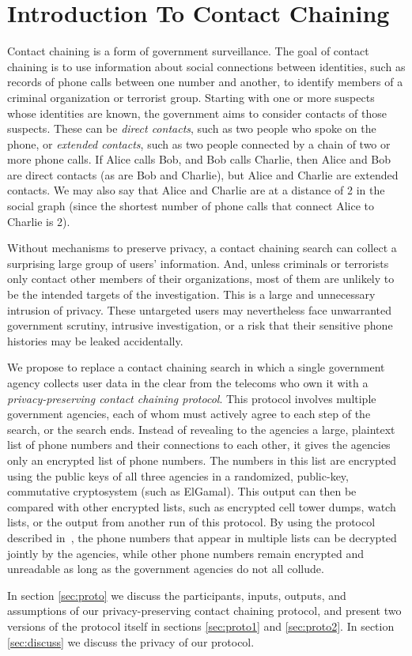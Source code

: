 \section{Introduction To Contact Chaining}

Contact chaining is a form of government surveillance. The goal of contact chaining is to use information about social connections between identities, such as records of phone calls between one number and another, to identify members of a criminal organization or terrorist group. Starting with one or more suspects whose identities are known, the government aims to consider contacts of those suspects. These can be \emph{direct contacts}, such as two people who spoke on the phone, or \emph{extended contacts}, such as two people connected by a chain of two or more phone calls. If Alice calls Bob, and Bob calls Charlie, then Alice and Bob are direct contacts (as are Bob and Charlie), but Alice and Charlie are extended contacts. We may also say that Alice and Charlie are at a distance of 2 in the social graph (since the shortest number of phone calls that connect Alice to Charlie is 2).

Without mechanisms to preserve privacy, a contact chaining search can collect a surprising large group of users' information. And, unless criminals or terrorists only contact other members of their organizations, most of them are unlikely to be the intended targets of the investigation. This is a large and unnecessary intrusion of privacy. These untargeted users may nevertheless face unwarranted government scrutiny, intrusive investigation, or a risk that their sensitive phone histories may be leaked accidentally.

We propose to replace a contact chaining search in which a single government agency collects user data in the clear from the telecoms who own it with a \emph{privacy-preserving contact chaining protocol}. This protocol involves multiple government agencies, each of whom must actively agree to each step of the search, or the search ends. Instead of revealing to the agencies a large, plaintext list of phone numbers and their connections to each other, it gives the agencies only an encrypted list of phone numbers. The numbers in this list are encrypted using the public keys of all three agencies in a randomized, public-key, commutative cryptosystem (such as ElGamal). This output can then be compared with other encrypted lists, such as encrypted cell tower dumps, watch lists, or the output from another run of this protocol. By using the protocol described in~\cite{bandits}, the phone numbers that appear in multiple lists can be decrypted jointly by the agencies, while other phone numbers remain encrypted and unreadable as long as the government agencies do not all collude.

In section \ref{sec:proto} we discuss the participants, inputs, outputs, and assumptions of our privacy-preserving contact chaining protocol, and present two versions of the protocol itself in sections \ref{sec:proto1} and \ref{sec:proto2}. In section \ref{sec:discuss} we discuss the privacy of our protocol.